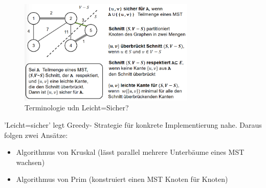 \documentclass{article}
\begin{document}
            \begin{figure}[ht]
                \centering
                \includegraphics[width=0.75\textwidth]{Bilder/MSTTerminologie.png}
                \caption{Terminologie udn Leicht=Sicher?}
                \label{fig:MSTTerminologie}
            \end{figure}
            'Leicht=sicher' legt Greedy- Strategie für konkrete Implementierung nahe. Daraus folgen zwei Ansätze:
            \begin{itemize}
                \item Algorithmus von Kruskal (lässt parallel mehrere Unterbäume eines MST wachsen)
                \item Algorithmus von Prim (konstruiert einen MST Knoten für Knoten)
            \end{itemize}
\end{document}
